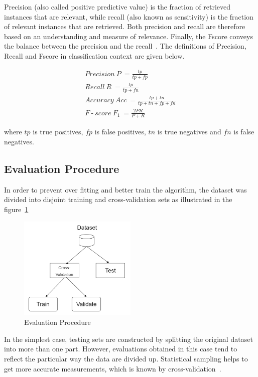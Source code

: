 \documentclass[letterpaper,10pt]{article}
\DeclareMathOperator{\dash}{-}
\theoremstyle{mytheor}
\begin{document}
Precision (also called positive predictive value) is the fraction of retrieved instances that are relevant, while recall (also known as sensitivity) is the fraction of relevant instances that are retrieved. Both precision and recall are therefore based on an understanding and measure of relevance. Finally, the  F\-score conveys the balance between the precision and the recall~\cite{wiki:pandr}. The definitions of Precision, Recall and F\-score in classification context are given below.

\begin{gather}
Precision\ P\ = \frac{tp}{tp + fp} \\ 
Recall\ R\ = \frac{tp}{tp + fn} \\
Accuracy\ Acc\ = \frac{tp + tn}{tp + tn + fp + fn} \\
F \dash score\ F_{1}\ = \frac{2PR}{P+R}
\end{gather}

where $tp$ is true positives, $fp$ is false positives, $tn$ is true negatives and $fn$ is false negatives.

\subsection{Evaluation Procedure}

In order to prevent over fitting and better train the algorithm, the dataset was divided into disjoint training and cross-validation sets as illustrated in the figure~\ref{fig:5}

\begin{figure}[H]
\includegraphics[width=0.5\textwidth]{procedure}
\centering
\caption{Evaluation Procedure}
\label{fig:5}
\end{figure}

In the simplest case, testing sets are constructed by splitting the original dataset into more than one part. However, evaluations obtained in this case tend to reflect the particular way the data are divided up. Statistical sampling helps to get more accurate measurements, which is known by cross-validation~\cite{kohavi1995study}.
\end{document}
